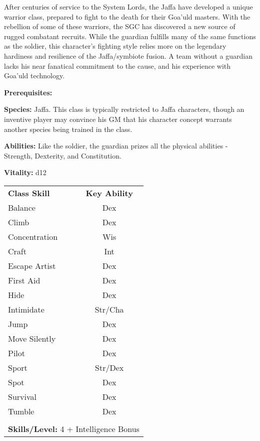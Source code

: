 \begin{multicols}{2}

After centuries of service to the System Lords, the Jaffa have developed a unique warrior class, prepared to fight to the death for their Goa'uld masters. With the rebellion of some of these warriors, the SGC has discovered a new source of rugged combatant recruits. While the guardian fulfills many of the same functions as the soldier, this character's fighting style relies more on the legendary hardiness and resilience of the Jaffa/symbiote fusion. A team without a guardian lacks his near fanatical commitment to the cause, and his experience with Goa'uld technology.

\textbf{Prerequisites:} 
\begin{description*}
\item[\hspace{1.5cm}\textbf{Species:}] Jaffa. This class is typically restricted to Jaffa characters, though an inventive player may convince his GM that his character concept warrants another species being trained in the class.
\end{description*}

\textbf{Abilities:} Like the soldier, the guardian prizes all the physical abilities - Strength, Dexterity, and Constitution.

\textbf{Vitality:} d12

\end{multicols}

\begin{table}[htb]
\raggedright
\begin{tabular}{l c}
\textbf{Class Skill} & \textbf{Key Ability}\\

Balance & Dex\\
Climb & Dex\\
Concentration & Wis\\
Craft & Int\\
Escape Artist & Dex\\
First Aid & Dex\\
Hide & Dex\\
Intimidate & Str/Cha\\
Jump & Dex\\
Move Silently & Dex\\
Pilot & Dex\\
Sport & Str/Dex\\
Spot & Dex\\
Survival & Dex\\
Tumble & Dex\\

\multicolumn{2}{l}{\cellcolor{white}}\\
\multicolumn{2}{l}{\cellcolor{white}\textbf{Skills/Level:} 4 + Intelligence Bonus}\\
\end{tabular}
\end{table}

